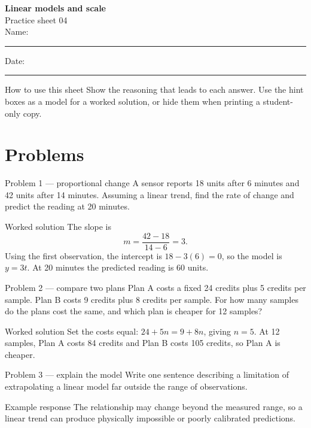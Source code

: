 \documentclass[12pt,a4paper]{article}
\begin{document}
\begin{center}
  {\Large\sffamily\bfseries Linear models and scale}\\[4pt]
  {\large Practice sheet 04}\\[6pt]
  Name: \rule{0.34\linewidth}{0.4pt}\hfill Date: \rule{0.20\linewidth}{0.4pt}
\end{center}

\begin{taskbox}{How to use this sheet}
Show the reasoning that leads to each answer.  Use the hint boxes as a model
for a worked solution, or hide them when printing a student-only copy.
\end{taskbox}

\section*{Problems}
\begin{taskbox}{Problem 1 — proportional change}
A sensor reports 18 units after 6 minutes and 42 units after 14 minutes.
Assuming a linear trend, find the rate of change and predict the reading at
20 minutes.
\end{taskbox}
\begin{hintbox}{Worked solution}
The slope is
\[
  m=\frac{42-18}{14-6}=3.
\]
Using the first observation, the intercept is $18-3(6)=0$, so the model is
$y=3t$.  At 20 minutes the predicted reading is $60$ units.
\end{hintbox}

\begin{taskbox}{Problem 2 — compare two plans}
Plan A costs a fixed 24 credits plus 5 credits per sample.  Plan B costs 9
credits plus 8 credits per sample.  For how many samples do the plans cost the
same, and which plan is cheaper for 12 samples?
\end{taskbox}
\begin{hintbox}{Worked solution}
Set the costs equal: $24+5n=9+8n$, giving $n=5$.  At 12 samples, Plan A costs
84 credits and Plan B costs 105 credits, so Plan A is cheaper.
\end{hintbox}

\begin{taskbox}{Problem 3 — explain the model}
Write one sentence describing a limitation of extrapolating a linear model far
outside the range of observations.
\end{taskbox}
\begin{hintbox}{Example response}
The relationship may change beyond the measured range, so a linear trend can
produce physically impossible or poorly calibrated predictions.
\end{hintbox}
\end{document}

